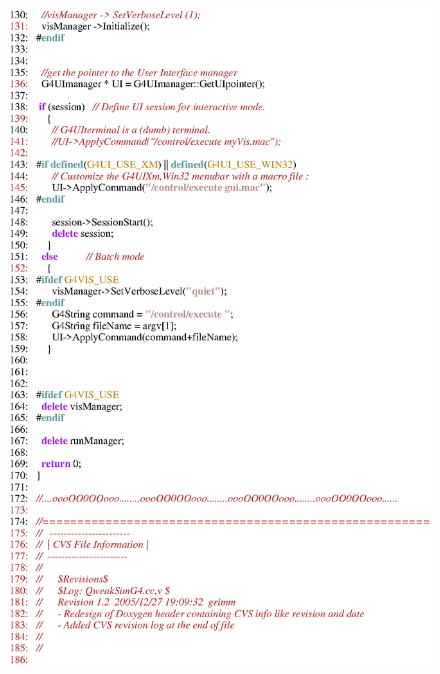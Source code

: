 \begin{figure}[h]
  \hspace{0cm}
  \includegraphics[scale=0.8]{./figures3/QweakSimG4-p3.eps}
  \caption{}
           \label{fig:MAIN2}
\end{figure}

